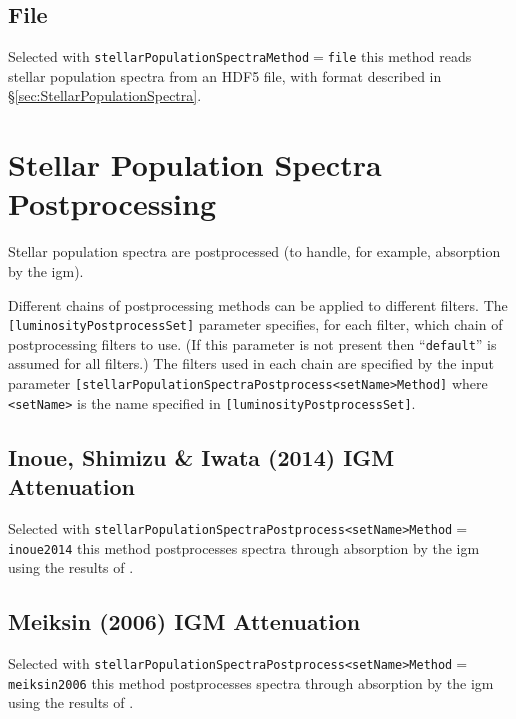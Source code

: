 \subsection{File}

Selected with {\tt stellarPopulationSpectraMethod}$=${\tt file} this method reads stellar population spectra from an HDF5 file, with format described in \S\ref{sec:StellarPopulationSpectra}.

\section{Stellar Population Spectra Postprocessing}\label{sec:StellarSpectraPostprocessing}

Stellar population spectra are postprocessed (to handle, for example, absorption by the \gls{igm}).

Different chains of postprocessing methods can be applied to different filters. The {\tt [luminosityPostprocessSet]} parameter specifies, for each filter, which chain of postprocessing filters to use. (If this parameter is not present then ``{\tt default}'' is assumed for all filters.) The filters used in each chain are specified by the input parameter {\tt [stellarPopulationSpectraPostprocess\textless setName\textgreater Method]} where {\tt \textless setName\textgreater} is the name specified in {\tt [luminosityPostprocessSet]}.

\subsection{Inoue, Shimizu \& Iwata (2014) IGM Attenuation}\label{phys:spectraPostprocessor:spectraPostprocessorInoue2014}

Selected with {\tt stellarPopulationSpectraPostprocess\textless setName\textgreater Method}$=${\tt inoue2014} this method postprocesses spectra through absorption by the \gls{igm} using the results of \cite{inoue_updated_2014}.

\subsection{Meiksin (2006) IGM Attenuation}\label{phys:spectraPostprocessor:spectraPostprocessorMeiksin2006}

Selected with {\tt stellarPopulationSpectraPostprocess\textless setName\textgreater Method}$=${\tt meiksin2006} this method postprocesses spectra through absorption by the \gls{igm} using the results of \cite{meiksin_colour_2006}.

